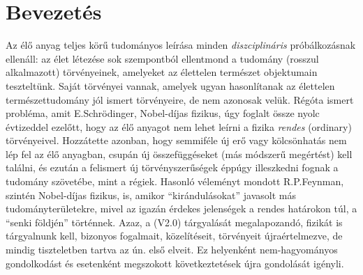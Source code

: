 \section{Bevezetés\label{sec:Physics-Introduction}}
Az élő anyag teljes körű tudományos leírása minden \textit{diszciplináris} próbálkozásnak ellenáll: az élet létezése sok szempontból ellentmond a tudomány (rosszul alkalmazott) törvényeinek, amelyeket az élettelen természet objektumain teszteltünk. Saját törvényei vannak, amelyek ugyan hasonlítanak az élettelen természettudomány jól ismert törvényeire, de nem azonosak velük. Régóta ismert probléma, amit E.Schrödinger, Nobel-díjas fizikus, úgy foglalt össze nyolc évtizeddel ezelőtt, hogy az élő anyagot nem lehet leírni a fizika \textit{rendes} (ordinary) törvényeivel. Hozzátette azonban, hogy semmiféle új erő vagy kölcsönhatás nem lép fel az élő anyagban, csupán új összefüggéseket (más módszerű megértést) kell találni, és ezután a felismert új törvényszerűségek éppúgy illeszkedni fognak a tudomány szövetébe, mint a régiek. Hasonló véleményt mondott R.P.Feynman, szintén Nobel-díjas fizikus, is, amikor “kirándulásokat” javasolt más tudományterületekre, mivel az igazán érdekes jelenségek a rendes határokon túl, a “senki földjén” történnek.
Azaz, a (V2.0) tárgyalását megalapozandó, fizikát is tárgyalnunk kell,
bizonyos fogalmait, közelítéseit, törvényeit újraértelmezve, de mindig tiszteletben tartva az ún. első elveit. Ez helyenként nem-hagyományos gondolkodást és esetenként megszokott következtetések újra gondolását igényli.



